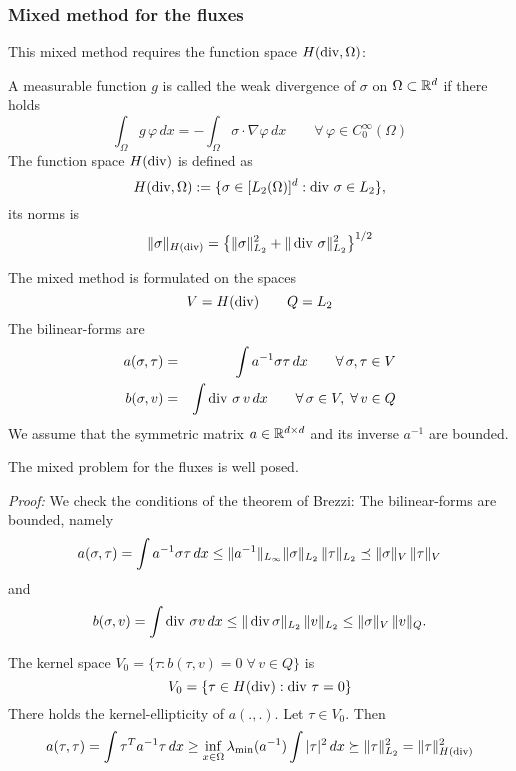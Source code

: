 \subsubsection{Mixed method for the fluxes}

This mixed method requires the function space $H(\operatorname{div}, \Omega)$:

\begin{definition} A measurable function $g$ is called the weak divergence
of $\sigma$ on $\Omega \subset {\mathbb R}^d$ if there holds
$$
\int_\Omega g \, \varphi \, dx = -\int_\Omega \sigma \cdot \nabla \varphi \, dx 
\qquad \forall \, \varphi \in C_0^\infty (\Omega)
$$
The function space $H(\operatorname{div})$ is defined as
$$
H(\operatorname{div},\Omega) := \{ \sigma \in [L_2(\Omega)]^d : \operatorname{div} \, \sigma \in L_2 \},
$$
its norms is
$$
\| \sigma \|_{H(\operatorname{div})} = \left\{ \| \sigma \|_{L_2}^2 + \| \operatorname{div} \, \sigma \|_{L_2}^2 \right \}^{1/2}
$$
\end{definition}

The mixed method is formulated on the spaces
$$
V = H(\operatorname{div}) \qquad Q = L_2
$$
The bilinear-forms are
\begin{eqnarray*}
a(\sigma, \tau) & = & \int a^{-1} \sigma \tau \, dx \qquad \forall \, \sigma, \tau \in V \\
b(\sigma, v) & = & \int \operatorname{div} \, \sigma \, v \, dx \qquad \forall \, \sigma \in V, \; \forall \, v \in Q
\end{eqnarray*}
We assume that the symmetric matrix $a \in {\mathbb R}^{d\times d}$
and its inverse $a^{-1}$ are bounded.

\begin{theorem} The mixed problem for the fluxes is well posed.
\end{theorem}
{\em Proof:} We check the conditions of the theorem of Brezzi:
The bilinear-forms are bounded, namely
$$
a(\sigma, \tau) = \int a^{-1} \sigma \tau \, dx \leq \| a^{-1} \|_{L_\infty} \| \sigma \|_{L_2} \, \| \tau \|_{L_2} \preceq \| \sigma \|_V \, \| \tau \|_V
$$
and 
$$
b(\sigma, v) = \int \operatorname{div} \, \sigma v \, dx \leq \| \operatorname{div} \sigma \|_{L_2} \, \| v \|_{L_2} \leq \| \sigma \|_V \, \| v \|_Q.
$$

The kernel space $V_0 = \{ \tau : b(\tau, v) = 0 \; \forall \, v \in Q \}$
is
$$
V_0 = \{ \tau \in H(\operatorname{div}) : \operatorname{div} \, \tau = 0 \}
$$
There holds the kernel-ellipticity of $a(.,.)$. Let $\tau \in V_0$. Then
$$
a(\tau, \tau) = \int \tau^T a^{-1} \tau \, dx \geq \inf_{x\in \Omega} \lambda_{\min} (a^{-1}) \int |\tau|^2 \,dx \succeq \| \tau \|_{L_2}^2 = \| \tau \|_{H(\operatorname{div})}^2
$$

